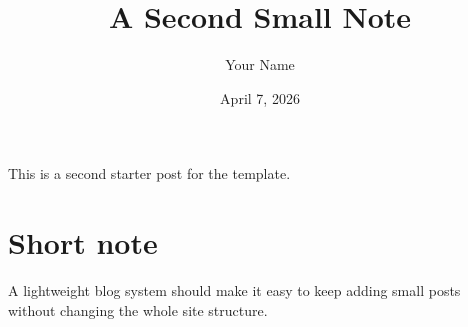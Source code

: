 \documentclass[12pt]{article}
\title{A Second Small Note}
\author{Your Name}
\date{April 7, 2026}
\begin{document}
\maketitle

This is a second starter post for the template.

\section*{Short note}
A lightweight blog system should make it easy to keep adding small posts without changing the whole site structure.
\end{document}

